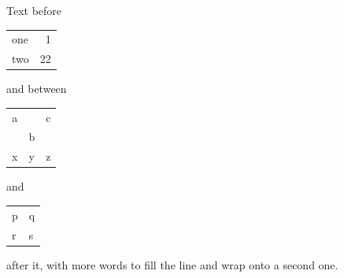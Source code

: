 \documentclass{article}
\begin{document}
Text before \begin{tabular}[t]{l@{: }r}
one & 1 \\
two & 22
\end{tabular} and between \begin{tabular}[b]{*{3}{c}}
a & & c \\[4pt]
 & b & \\[-2pt]
x & y & z
\end{tabular} and \begin{tabular}{@{}l|l@{}} p & q \\ r & s \end{tabular} after it, with more words to fill the line
and wrap onto a second one.
\end{document}
